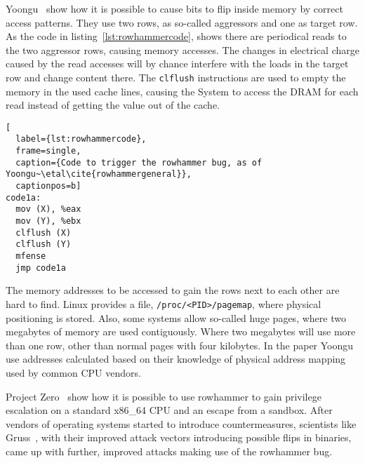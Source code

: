 Yoongu~\etal\cite{rowhammergeneral} show how it is possible to cause bits to
flip inside memory by correct access patterns. They use two rows, as so-called
aggressors and one as target row. As the code in
listing~\ref{lst:rowhammercode}, shows there are periodical reads to the two
aggressor rows, causing memory accesses. The changes in electrical charge caused
by the read accesses will by chance interfere with the loads in the target row
and change content there. The \texttt{clflush} instructions are used to empty
the memory in the used cache lines, causing the System to access the DRAM for
each read instead of getting the value out of the cache.

\begin{minipage}{\linewidth}
\begin{lstlisting}[
  label={lst:rowhammercode},
  frame=single,
  caption={Code to trigger the rowhammer bug, as of
Yoongu~\etal\cite{rowhammergeneral}},
  captionpos=b]
code1a:
  mov (X), %eax
  mov (Y), %ebx
  clflush (X)
  clflush (Y)
  mfense
  jmp code1a
\end{lstlisting}
\end{minipage}


The memory addresses to be accessed to gain the rows next to each other are hard
to find. Linux provides a file, \texttt{/proc/<PID>/pagemap}, where physical
positioning is stored. Also, some systems allow so-called huge pages, where two
megabytes of memory are used contiguously. Where two megabytes will use more
than one row, other than normal pages with four kilobytes. In the paper
Yoongu~\etal\cite{rowhammergeneral} use addresses calculated based on their
knowledge of physical address mapping used by common CPU vendors.

Project Zero~\cite{projectzerorow} show how it is possible to use rowhammer to
gain privilege escalation on a standard x86\_64 CPU and an escape from a
sandbox. After vendors of operating systems started to introduce
countermeasures, scientists like Gruss~\etal\cite{rowhammerjs}, with their
improved attack vectors introducing possible flips in binaries, came up with
further, improved attacks making use of the rowhammer bug.

